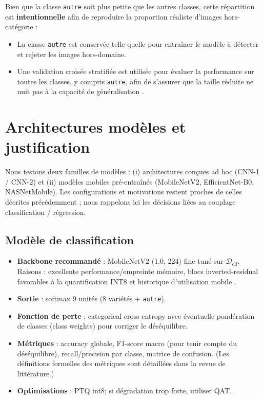 Bien que la classe \texttt{autre} soit plus petite que les autres classes, cette répartition est \textbf{intentionnelle} afin de reproduire la proportion réaliste d’images hors-catégorie :

\begin{itemize}
    \item La classe \texttt{autre} est conservée telle quelle pour entraîner le modèle à détecter et rejeter les images hors-domaine.  
    \item Une validation croisée stratifiée est utilisée pour évaluer la performance sur toutes les classes, y compris \texttt{autre}, afin de s’assurer que la taille réduite ne nuit pas à la capacité de généralisation \cite{buda2018systematic}.
\end{itemize}


\section{Architectures modèles et justification}

Nous testons deux familles de modèles : (i) architectures conçues ad hoc (CNN-1 / CNN-2) et (ii) modèles mobiles pré-entraînés (MobileNetV2, EfficientNet-B0, NASNetMobile). Les configurations et motivations restent proches de celles décrites précédemment ; nous rappelons ici les décisions liées au couplage classification / régression.

\subsection{Modèle de classification}

\begin{itemize}
    \item \textbf{Backbone recommandé} : MobileNetV2 (1.0, 224) fine-tuné sur \(\mathcal{D}_{\text{clf}}\). Raisons : excellente performance/empreinte mémoire, blocs inverted-residual favorables à la quantification INT8 et historique d'utilisation mobile \cite{sandler2018mobilenetv2}.
    \item \textbf{Sortie} : softmax 9 unités (8 variétés + \texttt{autre}).
    \item \textbf{Fonction de perte} : categorical cross-entropy avec éventuelle pondération de classes (class weights) pour corriger le déséquilibre.
    \item \textbf{Métriques} : accuracy globale, F1-score macro (pour tenir compte du déséquilibre), recall/precision par classe, matrice de confusion. (Les définitions formelles des métriques sont détaillées dans la revue de littérature.)
    \item \textbf{Optimisations} : PTQ int8; si dégradation trop forte, utiliser QAT.
\end{itemize}

